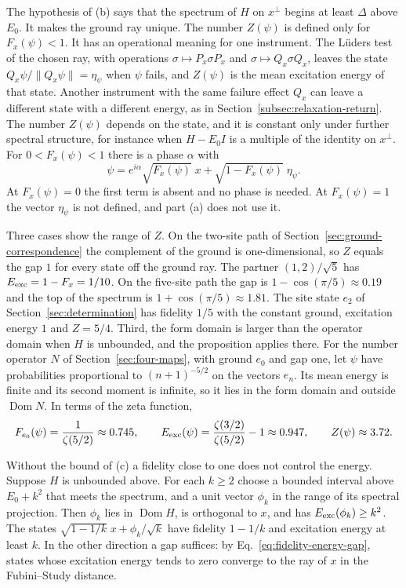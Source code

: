 The hypothesis of (b) says that the spectrum of $H$ on $x^\perp$ begins at least $\Delta$ above $E_0$. It makes the ground ray unique. The number $Z(\psi)$ is defined only for $F_x(\psi)<1$. It has an operational meaning for one instrument. The L\"uders test of the chosen ray, with operations $\sigma\mapsto P_x\sigma P_x$ and $\sigma\mapsto Q_x\sigma Q_x$, leaves the state $Q_x\psi/\|Q_x\psi\|=\eta_\psi$ when $\psi$ fails, and $Z(\psi)$ is the mean excitation energy of that state. Another instrument with the same failure effect $Q_x$ can leave a different state with a different energy, as in Section~\ref{subsec:relaxation-return}. The number $Z(\psi)$ depends on the state, and it is constant only under further spectral structure, for instance when $H-E_0I$ is a multiple of the identity on $x^\perp$. For $0<F_x(\psi)<1$ there is a phase $\alpha$ with
\begin{equation}
 \psi=e^{i\alpha}\sqrt{F_x(\psi)}\;x+\sqrt{1-F_x(\psi)}\;\eta_\psi .
 \label{eq:fidelity-energy-decomposition}
\end{equation}
At $F_x(\psi)=0$ the first term is absent and no phase is needed. At $F_x(\psi)=1$ the vector $\eta_\psi$ is not defined, and part (a) does not use it.

Three cases show the range of $Z$. On the two-site path of Section~\ref{sec:ground-correspondence} the complement of the ground is one-dimensional, so $Z$ equals the gap $1$ for every state off the ground ray. The partner $(1,2)/\sqrt5$ has $E_{\rm exc}=1-F_x=1/10$. On the five-site path the gap is $1-\cos(\pi/5)\approx0.19$ and the top of the spectrum is $1+\cos(\pi/5)\approx1.81$. The site state $e_2$ of Section~\ref{sec:determination} has fidelity $1/5$ with the constant ground, excitation energy $1$ and $Z=5/4$. Third, the form domain is larger than the operator domain when $H$ is unbounded, and the proposition applies there. For the number operator $N$ of Section~\ref{sec:four-maps}, with ground $e_0$ and gap one, let $\psi$ have probabilities proportional to $(n+1)^{-5/2}$ on the vectors $e_n$. Its mean energy is finite and its second moment is infinite, so it lies in the form domain and outside $\operatorname{Dom}N$. In terms of the zeta function,
\begin{equation}
 F_{e_0}(\psi)=\frac1{\zeta(5/2)}\approx0.745,\qquad
 E_{\rm exc}(\psi)=\frac{\zeta(3/2)}{\zeta(5/2)}-1\approx0.947,\qquad Z(\psi)\approx3.72 .
 \label{eq:fidelity-energy-oscillator}
\end{equation}

Without the bound of (c) a fidelity close to one does not control the energy. Suppose $H$ is unbounded above. For each $k\ge2$ choose a bounded interval above $E_0+k^2$ that meets the spectrum, and a unit vector $\phi_k$ in the range of its spectral projection. Then $\phi_k$ lies in $\operatorname{Dom}H$, is orthogonal to $x$, and has $E_{\rm exc}(\phi_k)\ge k^2$. The states $\sqrt{1-1/k}\;x+\phi_k/\sqrt k$ have fidelity $1-1/k$ and excitation energy at least $k$. In the other direction a gap suffices: by Eq.~\eqref{eq:fidelity-energy-gap}, states whose excitation energy tends to zero converge to the ray of $x$ in the Fubini--Study distance.

